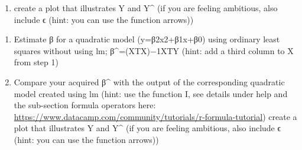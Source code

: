 \documentclass[
]{article}
\providecommand{\tightlist}{%
  \setlength{\itemsep}{0pt}\setlength{\parskip}{0pt}}
\begin{document}
\begin{enumerate}
\def\labelenumi{\roman{enumi}.}
\tightlist
\item
  create a plot that illustrates Y and Y\^{} (if you are feeling
  ambitious, also include ϵ (hint: you can use the function arrows))
\end{enumerate}

\begin{enumerate}
\def\labelenumi{\arabic{enumi}.}
\setcounter{enumi}{1}
\item
  Estimate β for a quadratic model (y=β2x2+β1x+β0) using ordinary least
  squares without using lm; β\^{}=(XTX)−1XTY (hint: add a third column
  to X from step 1)
\item
  Compare your acquired β\^{} with the output of the corresponding
  quadratic model created using lm (hint: use the function I, see
  details under help and the sub-section formula operators here:
  \url{https://www.datacamp.com/community/tutorials/r-formula-tutorial})
  create a plot that illustrates Y and Y\^{} (if you are feeling
  ambitious, also include ϵ (hint: you can use the function arrows))
\end{enumerate}
\end{document}
